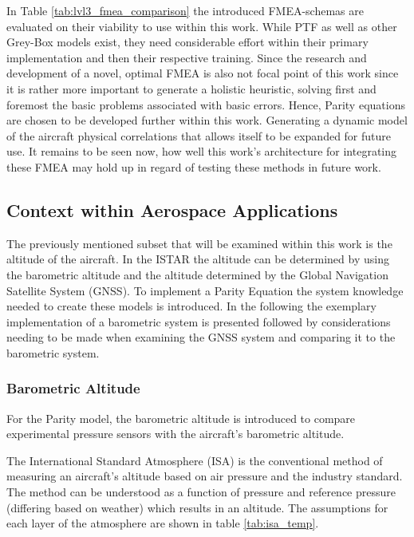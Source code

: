 In Table \ref{tab:lvl3_fmea_comparison} the introduced FMEA-schemas are evaluated on their viability to use within this work. While PTF as well as other Grey-Box models exist, they need considerable effort within their primary implementation and then their respective training. Since the research and development of a novel, optimal FMEA is also not focal point of this work since it is rather more important to generate a holistic heuristic, solving first and foremost the basic problems associated with basic errors. Hence, Parity equations are chosen to be developed further within this work. Generating a dynamic model of the aircraft physical correlations that allows itself to be expanded for future use. It remains to be seen now, how well this work's architecture for integrating these FMEA may hold up in regard of testing these methods in future work.



\subsection{Context within Aerospace Applications}
The previously mentioned subset that will be examined within this work is the altitude of the aircraft. In the ISTAR the altitude can be determined by using the barometric altitude and the altitude determined by the Global Navigation Satellite System (GNSS). To implement a Parity Equation the system knowledge needed to create these models is introduced.
In the following the exemplary implementation of a barometric system is presented followed by considerations needing to be made when examining the GNSS system and comparing it to the barometric system.

\subsubsection{Barometric Altitude}
For the Parity model, the barometric altitude is introduced to compare experimental pressure sensors with the aircraft's barometric altitude.

The International Standard Atmosphere (ISA) is the conventional method of measuring an aircraft's altitude based on air pressure and the industry standard. \cite{iso_standard_1975} The method can be understood as a function of pressure and reference pressure (differing based on weather) which results in an altitude. The assumptions for each layer of the atmosphere are shown in table \ref{tab:isa_temp}.


